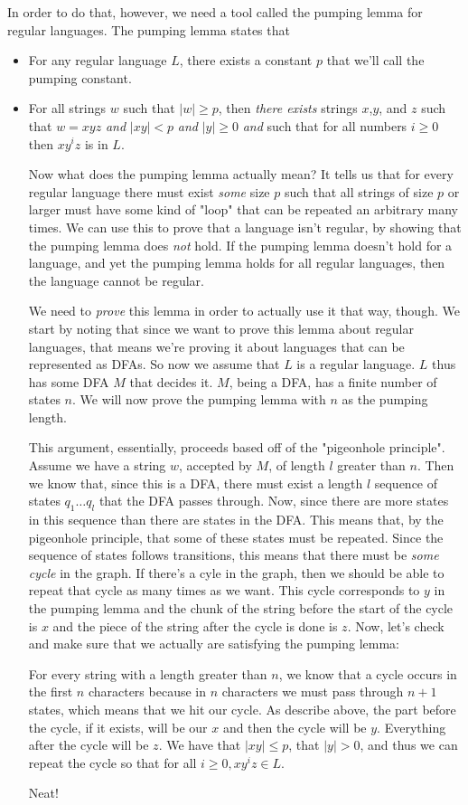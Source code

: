 \documentclass[11pt]{article}
\begin{document}
In order to do that, however, we need a tool called the pumping lemma for regular languages. The pumping lemma states that 

\begin{itemize}
\item For any regular language $L$, there exists a constant $p$ that we'll call the pumping constant.
\item For all strings $w$ such that $|w| \geq p$, then \emph{there exists} strings $x$,$y$, and $z$ such that $w = xyz$ \emph{and} $|xy| < p$ \emph{and} $|y| \geq 0$ \emph{and} such that for all numbers $i \geq 0$ then $xy^iz$ is in $L$.

Now what does the pumping lemma actually mean? It tells us that for every regular language there must exist \emph{some} size $p$ such that all strings of size $p$ or larger must have some kind of "loop" that can be repeated an arbitrary many times. We can use this to prove that a language isn't regular, by showing that the pumping lemma does \emph{not} hold. If the pumping lemma doesn't hold for a language, and yet the pumping lemma holds for all regular languages, then the language cannot be regular.

We need to \emph{prove} this lemma in order to actually use it that way, though. We start by noting that since we want to prove this lemma about regular languages, that means we're proving it about languages that can be represented as DFAs. So now we assume that $L$ is a regular language. $L$ thus has some DFA $M$ that decides it. $M$, being a DFA, has a finite number of states $n$. We will now prove the pumping lemma with $n$ as the pumping length. 

This argument, essentially, proceeds based off of the "pigeonhole principle". Assume we have a string $w$, accepted by $M$, of length $l$ greater than $n$. Then we know that, since this is a DFA, there must exist a length $l$ sequence of states $q_1 \ldots q_l$ that the DFA passes through. Now, since there are more states in this sequence than there are states in the DFA. This means that, by the pigeonhole principle, that some of these states must be repeated. Since the sequence of states follows transitions, this means that there must be \emph{some cycle} in the graph. If there's a cyle in the graph, then we should be able to repeat that cycle as many times as we want. This cycle corresponds to $y$ in the pumping lemma and the chunk of the string before the start of the cycle is $x$ and the piece of the string after the cycle is done is $z$. Now, let's check and make sure that we actually are satisfying the pumping lemma:

For every string with a length greater than $n$, we know that a cycle occurs in the first $n$ characters because in $n$ characters we must pass through $n+1$ states, which means that we hit our cycle. As describe above, the part before the cycle, if it exists, will be our $x$ and then the cycle will be $y$. Everything after the cycle will be $z$. We have that $|xy| \leq p$, that $|y| > 0$, and thus we can repeat the cycle so that for all $i \geq 0, xy^iz \in L$.

Neat!
\end{itemize}
\end{document}
